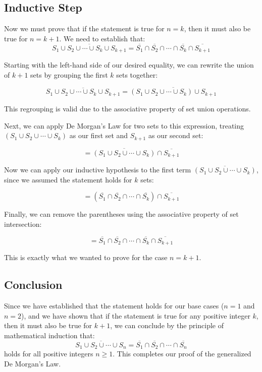 \documentclass{article}
\begin{document}
\subsection{Inductive Step}
Now we must prove that if the statement is true for $n = k$, then it must also be true for $n = k + 1$. We need to establish that:
$$\overline{S_1 \cup S_2 \cup \cdots \cup S_k \cup S_{k+1}} = \overline{S_1} \cap \overline{S_2} \cap \cdots \cap \overline{S_k} \cap \overline{S_{k+1}}$$

Starting with the left-hand side of our desired equality, we can rewrite the union of $k+1$ sets by grouping the first $k$ sets together:

$$\overline{S_1 \cup S_2 \cup \cdots \cup S_k \cup S_{k+1}} = \overline{(S_1 \cup S_2 \cup \cdots \cup S_k) \cup S_{k+1}}$$

This regrouping is valid due to the associative property of set union operations.

Next, we can apply De Morgan's Law for two sets to this expression, treating $(S_1 \cup S_2 \cup \cdots \cup S_k)$ as our first set and $S_{k+1}$ as our second set:

$$= \overline{(S_1 \cup S_2 \cup \cdots \cup S_k)} \cap \overline{S_{k+1}}$$

Now we can apply our inductive hypothesis to the first term $\overline{(S_1 \cup S_2 \cup \cdots \cup S_k)}$, since we assumed the statement holds for $k$ sets:

$$= (\overline{S_1} \cap \overline{S_2} \cap \cdots \cap \overline{S_k}) \cap \overline{S_{k+1}}$$

Finally, we can remove the parentheses using the associative property of set intersection:

$$= \overline{S_1} \cap \overline{S_2} \cap \cdots \cap \overline{S_k} \cap \overline{S_{k+1}}$$

This is exactly what we wanted to prove for the case $n = k + 1$.

\subsection{Conclusion}
Since we have established that the statement holds for our base cases ($n = 1$ and $n = 2$), and we have shown that if the statement is true for any positive integer $k$, then it must also be true for $k + 1$, we can conclude by the principle of mathematical induction that:
$$\overline{S_1 \cup S_2 \cup \cdots \cup S_n} = \overline{S_1} \cap \overline{S_2} \cap \cdots \cap \overline{S_n}$$
holds for all positive integers $n \geq 1$. This completes our proof of the generalized De Morgan's Law.
\end{document}
